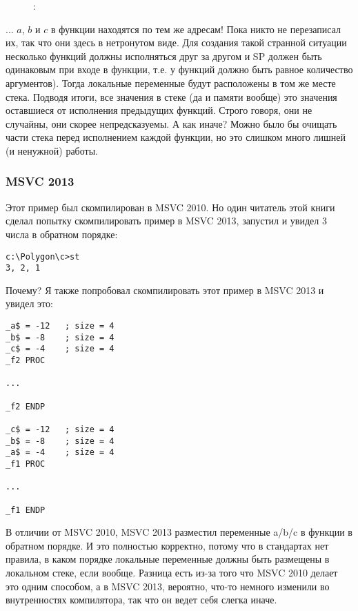 \begin{figure}[H]
\centering
{}
\caption{\olly: }
\label{fig:stack_noise_olly2}
\end{figure}

... $a$, $b$ и $c$ в функции  находятся по тем же адресам!
Пока никто не перезаписал их, так что они здесь в нетронутом виде.
Для создания такой странной ситуации несколько функций должны исполняться друг за другом
и \ac{SP} должен быть одинаковым при входе в функции, т.е. у функций должно быть равное количество
аргументов). Тогда локальные переменные будут расположены в том же месте стека.
Подводя итоги, все значения в стеке (да и памяти вообще) это значения оставшиеся от 
исполнения предыдущих функций.
Строго говоря, они не случайны, они скорее непредсказуемы.
А как иначе?
Можно было бы очищать части стека перед исполнением каждой функции,
но это слишком много лишней (и ненужной) работы.

\subsubsection{MSVC 2013}

Этот пример был скомпилирован в MSVC 2010.
Но один читатель этой книги сделал попытку скомпилировать пример в MSVC 2013, запустил и увидел 3 числа в обратном порядке:

\begin{lstlisting}
c:\Polygon\c>st
3, 2, 1
\end{lstlisting}

Почему?
Я также попробовал скомпилировать этот пример в MSVC 2013 и увидел это:

\begin{lstlisting}[caption=MSVC 2013,style=customasmx86]
_a$ = -12	; size = 4
_b$ = -8	; size = 4
_c$ = -4	; size = 4
_f2	PROC

...

_f2	ENDP

_c$ = -12	; size = 4
_b$ = -8	; size = 4
_a$ = -4	; size = 4
_f1	PROC

...

_f1	ENDP
\end{lstlisting}

В отличии от MSVC 2010, MSVC 2013 разместил переменные a/b/c в функции  в обратном порядке.
И это полностью корректно, потому что в стандартах \CCpp нет правила, в каком порядке локальные переменные должны быть размещены в локальном стеке, если вообще.
Разница есть из-за того что MSVC 2010 делает это одним способом, а в MSVC 2013, вероятно, что-то немного изменили во внутренностях компилятора, так что он ведет себя слегка иначе.


